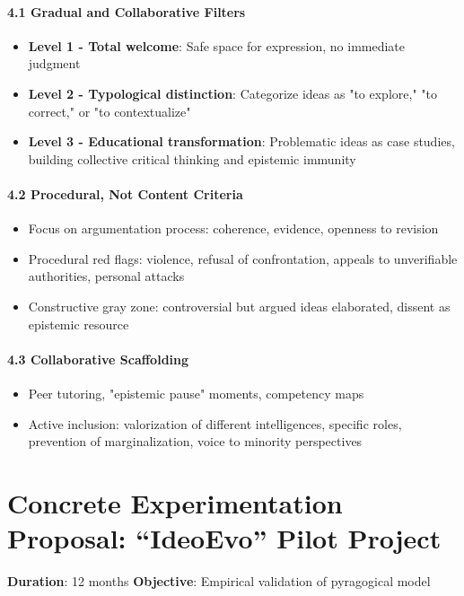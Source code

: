 \paragraph{4.1 Gradual and Collaborative Filters}
\begin{itemize}
	\item \textbf{Level 1 - Total welcome}: Safe space for expression, no immediate judgment
	\item \textbf{Level 2 - Typological distinction}: Categorize ideas as "to explore," "to correct," or "to contextualize"
	\item \textbf{Level 3 - Educational transformation}: Problematic ideas as case studies, building collective critical thinking and epistemic immunity
\end{itemize}

\paragraph{4.2 Procedural, Not Content Criteria}
\begin{itemize}
	\item Focus on argumentation process: coherence, evidence, openness to revision
	\item Procedural red flags: violence, refusal of confrontation, appeals to unverifiable authorities, personal attacks
	\item Constructive gray zone: controversial but argued ideas elaborated, dissent as epistemic resource
\end{itemize}

\paragraph{4.3 Collaborative Scaffolding}
\begin{itemize}
	\item Peer tutoring, "epistemic pause" moments, competency maps
	\item Active inclusion: valorization of different intelligences, specific roles, prevention of marginalization, voice to minority perspectives
\end{itemize}

\newpage
\section{Concrete Experimentation Proposal: ``IdeoEvo'' Pilot Project}
\textbf{Duration}: 12 months  
\textbf{Objective}: Empirical validation of pyragogical model

